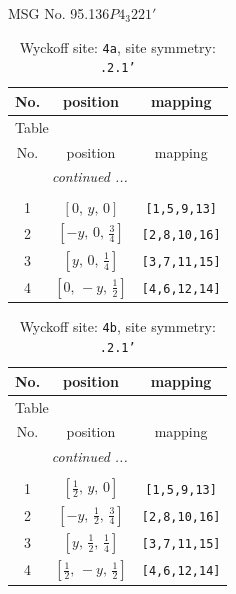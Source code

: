 \documentclass[fleqn,8pt]{jsarticle}
\begin{document}
\setcounter{MaxMatrixCols}{32}

\renewcommand{\tablename}{Table~}
\renewcommand{\figurename}{Figure~}
\begin{center}
\LARGE
MSG No. 95.136\quad$P4_{3}221'$
\end{center}
\renewcommand{\arraystretch}{1.2}
\begin{longtable}{ccc}
\caption{Wyckoff site: {\tt 4a}, site symmetry: {\tt .2.1'}}
 \\
 \hline \hline
No. & position & mapping \\ \hline \endfirsthead

\multicolumn{2}{l}{\tablename\ \thetable{}} \\
 \hline \hline
No. & position & mapping \\ \hline \endhead

 \hline \hline
\multicolumn{2}{r}{\footnotesize\it continued ...} \\ \endfoot

 \hline \hline
\multicolumn{2}{r}{} \\ \endlastfoot

1 & $\left[ 0,\, y,\, 0 \right]$ & {\tt [1,5,9,13]} \\ \hline
2 & $\left[ - y,\, 0,\, \frac{3}{4} \right]$ & {\tt [2,8,10,16]} \\ \hline
3 & $\left[ y,\, 0,\, \frac{1}{4} \right]$ & {\tt [3,7,11,15]} \\ \hline
4 & $\left[ 0,\, - y,\, \frac{1}{2} \right]$ & {\tt [4,6,12,14]} \\
\end{longtable}
\renewcommand{\arraystretch}{1.2}
\begin{longtable}{ccc}
\caption{Wyckoff site: {\tt 4b}, site symmetry: {\tt .2.1'}}
 \\
 \hline \hline
No. & position & mapping \\ \hline \endfirsthead

\multicolumn{2}{l}{\tablename\ \thetable{}} \\
 \hline \hline
No. & position & mapping \\ \hline \endhead

 \hline \hline
\multicolumn{2}{r}{\footnotesize\it continued ...} \\ \endfoot

 \hline \hline
\multicolumn{2}{r}{} \\ \endlastfoot

1 & $\left[ \frac{1}{2},\, y,\, 0 \right]$ & {\tt [1,5,9,13]} \\ \hline
2 & $\left[ - y,\, \frac{1}{2},\, \frac{3}{4} \right]$ & {\tt [2,8,10,16]} \\ \hline
3 & $\left[ y,\, \frac{1}{2},\, \frac{1}{4} \right]$ & {\tt [3,7,11,15]} \\ \hline
4 & $\left[ \frac{1}{2},\, - y,\, \frac{1}{2} \right]$ & {\tt [4,6,12,14]} \\
\end{longtable}
\end{document}
